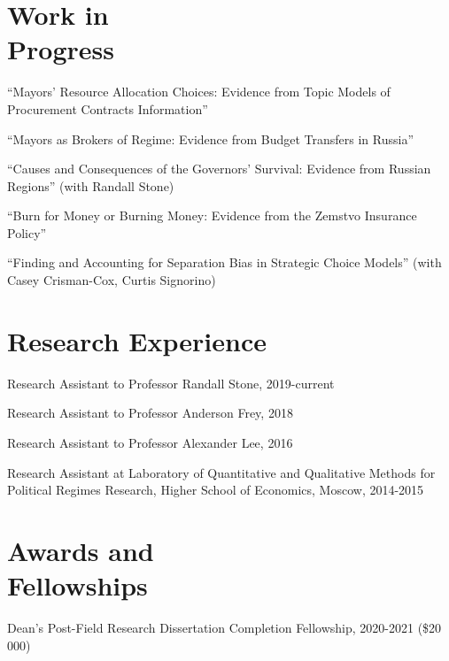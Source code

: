 \documentclass[margin,line,12pt]{res}
\begin{document}
\begin{resume}
\section{\sc Work in \\ Progress}
``Mayors’ Resource Allocation Choices: Evidence from Topic Models of Procurement
Contracts Information''


\vspace*{-3.5mm}


``Mayors as Brokers of Regime: Evidence from Budget Transfers in Russia''


\vspace*{-3.5mm}

``Causes and Consequences of the Governors' Survival: Evidence from Russian Regions'' (with Randall Stone)

\vspace*{-3.5mm}
``Burn for Money or Burning Money: Evidence from the Zemstvo Insurance Policy''


\vspace*{-3.5mm}
``Finding and Accounting for Separation Bias in Strategic Choice Models'' (with Casey Crisman-Cox, Curtis Signorino)




\section{\sc Research Experience}

Research Assistant to Professor Randall Stone, 2019-current 

\vspace*{-4.5mm}
Research Assistant to Professor Anderson Frey, 2018

\vspace*{-4.5mm}
Research Assistant to Professor Alexander Lee, 2016

\vspace*{-4.5mm}
Research Assistant at Laboratory of Quantitative and Qualitative Methods 
for Political Regimes Research, Higher School of Economics, Moscow, 2014-2015 

\section{\sc Awards and \\ Fellowships}
Dean's Post-Field Research Dissertation Completion Fellowship, 2020-2021 (\$20 000)
\vspace*{-4.5mm}


\end{resume}
\end{document}
